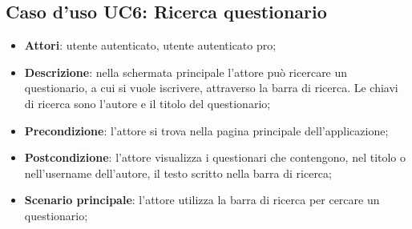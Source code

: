 \newpage
\subsection{Caso d'uso UC6: Ricerca questionario}
\label{UC6}
\begin{itemize}
\item\textbf{Attori}: utente autenticato, utente autenticato pro;
\item\textbf{Descrizione}: nella schermata principale l'attore può ricercare un questionario, a cui si vuole iscrivere, attraverso la barra di ricerca. Le chiavi di ricerca sono l'autore e il titolo del questionario;	
\item\textbf{Precondizione}: l'attore si trova nella pagina principale dell'applicazione;
\item\textbf{Postcondizione}: l'attore visualizza i questionari che contengono, nel titolo o nell'username dell'autore, il testo scritto nella barra di ricerca;
\item\textbf{Scenario principale}:
l'attore utilizza la barra di ricerca per cercare un questionario;
\end{itemize}